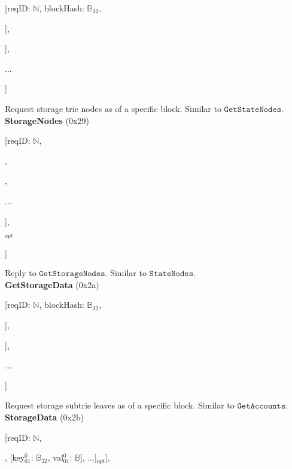 \documentclass{amsart}
\begin{document}
[reqID: $\mathbb{N}$, blockHash: $\mathbb{B}_{32}$,

\quad [addressHash$^0$: $\mathbb{B}_{32}$, [prefix$^0_0$: $\mathbb{Y}$, prefix$^0_1$: $\mathbb{Y}$, ...]],

\quad [addressHash$^1$: $\mathbb{B}_{32}$, [prefix$^1_0$: $\mathbb{Y}$, prefix$^1_1$: $\mathbb{Y}$, ...]],

\quad ...

]
\medskip

Request storage trie nodes as of a specific block.
Similar to $\texttt{GetStateNodes}$.\\

\textbf{StorageNodes} (0x29)

[reqID: $\mathbb{N}$,

\quad [

\qquad [node$^0_0$: $\mathbb{B}$, node$^0_1$: $\mathbb{B}$, ...],

,

\qquad ...

\quad ],

$_{opt}$

]
\medskip

Reply to $\texttt{GetStorageNodes}$.
Similar to $\texttt{StateNodes}$.\\

\textbf{GetStorageData} (0x2a)

[reqID: $\mathbb{N}$, blockHash: $\mathbb{B}_{32}$,

\quad [addressHash$^0$: $\mathbb{B}_{32}$, [prefix$^0_0$: $\mathbb{Y}$, prefix$^0_1$: $\mathbb{Y}$, ...]],

\quad [addressHash$^1$: $\mathbb{B}_{32}$, [prefix$^1_0$: $\mathbb{Y}$, prefix$^1_1$: $\mathbb{Y}$, ...]],

\quad ...

]
\medskip

Request storage subtrie leaves as of a specific block.
Similar to $\texttt{GetAccounts}$.\\

\textbf{StorageData} (0x2b)
\nopagebreak

[reqID: $\mathbb{N}$,

\quad [

\qquad [

\quad \qquad [status$^0_0$: $\mathbb{N}$, [[key$^0_{00}$: $\mathbb{B}_{32}$, val$^0_{00}$: $\mathbb{B}$], [key$^0_{01}$: $\mathbb{B}_{32}$, val$^0_{01}$: $\mathbb{B}$], ...]$_{opt}$],
\end{document}
